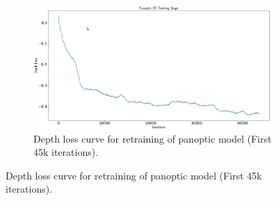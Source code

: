 \begin{figure}[h]
  \centering
  \begin{subfigure}[b]{0.45\linewidth}
    \centering
    \includegraphics[width=\linewidth]{figs/depthloss.png}
    \caption{Depth loss curve for retraining of panoptic model (First 45k iterations).}
    \label{subfig:additional}
    \vspace*{-3mm} %
  \end{subfigure}
\end{figure}
\fi